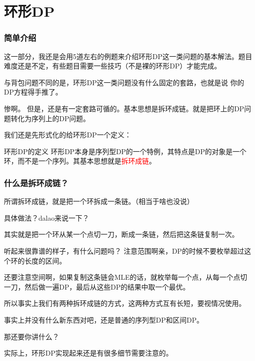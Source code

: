 \documentclass[UTF-8,aspectratio=1610]{ctexbeamer}
\begin{document}
\section{环形DP}
\begin{frame}
\frametitle{简单介绍}
这一部分，我还是会用5道左右的例题来介绍环形DP这一类问题的基本解法。题目难度还是不定，有些题目需要一些技巧（不是裸的环形DP）才能完成。\pause

与背包问题不同的是，环形DP这一类问题没有什么固定的套路，也就是说\pause
你的DP方程得手推了。\pause

惨啊。\pause
但是，还是有一定套路可循的。基本思想是拆环成链。就是把环上的DP问题转化为序列上的DP问题。

我们还是先形式化的给环形DP一个定义：\pause
\begin{alertblock}{环形DP的定义}
环形DP本身是序列型DP的一个特例，其特点是DP的对象是一个环，而不是一个序列。其基本思想就是\textcolor{red}{拆环成链}。
\end{alertblock}
\end{frame}
\begin{frame}
\frametitle{什么是拆环成链？}
所谓拆环成链，就是把一个环拆成一条链。（相当于啥也没说）\pause

具体做法？dalao来说一下？\pause

其实就是把一个环从某一个点切一刀，断成一条链，然后把这条链复制一次。\pause

\begin{alertblock}{听起来很靠谱的样子，有什么问题吗？}
\pause
注意范围啊亲，DP的时候不要枚举超过这个环的长度的区间。\pause

还要注意空间啊，如果复制这条链会MLE的话，就枚举每一个点，从每一个点切一刀，然后做一遍DP，最后从这些DP的结果中取一个最优。
\end{alertblock}\pause
所以事实上我们有两种拆环成链的方式，这两种方式互有长短，要视情况使用。\pause

事实上并没有什么新东西对吧，还是普通的序列型DP和区间DP。\pause

那还要你讲什么？\pause

实际上，环形DP实现起来还是有很多细节需要注意的。
\end{frame}
\end{document}
